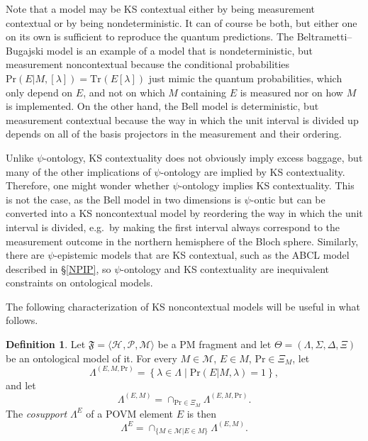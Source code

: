 \documentclass[DIV=calc,paper=a4,fontsize=11pt,twocolumn]{scrartcl} %
\theoremstyle{definition}
\newtheorem{definition}{Definition}[section]
\theoremstyle{plain}
\newcommand{\Proj}[1]{\ensuremath{\left [ #1 \right ]}}
\newcommand{\Hilb}[1][]{\ensuremath{\mathcal{H}_{#1}}}
\newcommand{\Tr}[2][]{\ensuremath{\text{Tr}_{#1} \left ( #2 \right )}}
\begin{document}
Note that a model may be KS contextual either by being measurement
contextual or by being nondeterministic.  It can of course be both,
but either one on its own is sufficient to reproduce the quantum
predictions.  The Beltrametti--Bugajski model is an example of a model
that is nondeterministic, but measurement noncontextual because the
conditional probabilities $\text{Pr}(E|M,\Proj{\lambda}) = \Tr{E
\Proj{\lambda}}$ just mimic the quantum probabilities, which only
depend on $E$, and not on which $M$ containing $E$ is measured nor on
how $M$ is implemented.  On the other hand, the Bell model is
deterministic, but measurement contextual because the way in which the
unit interval is divided up depends on all of the basis projectors in
the measurement and their ordering.

Unlike $\psi$-ontology, KS contextuality does not obviously imply
excess baggage, but many of the other implications of $\psi$-ontology
are implied by KS contextuality.  Therefore, one might wonder whether
$\psi$-ontology implies KS contextuality.  This is not the case, as
the Bell model in two dimensions is $\psi$-ontic but can be converted
into a KS noncontextual model by reordering the way in which the unit
interval is divided, e.g.\ by making the first interval always
correspond to the measurement outcome in the northern hemisphere of
the Bloch sphere.  Similarly, there are $\psi$-epistemic models that
are KS contextual, such as the ABCL model described in \S\ref{NPIP},
so $\psi$-ontology and KS contextuality are inequivalent constraints
on ontological models.

The following characterization of KS noncontextual models will be
useful in what follows.

\begin{definition}
\label{def:KS:cosupp}
Let $\mathfrak{F} = \langle \Hilb, \mathcal{P}, \mathcal{M} \rangle$
be a PM fragment and let $\Theta = (\Lambda, \Sigma, \Delta, \Xi)$
be an ontological model of it.  For every $M \in \mathcal{M}$, $E
\in M$, $\text{Pr} \in \Xi_M$, let
\begin{equation}
\Lambda^{(E,M,\text{Pr})} = \left \{ \lambda \in \Lambda \middle |
\text{Pr}(E|M,\lambda) = 1 \right \},
\end{equation}
and let
\begin{equation}
\Lambda^{(E,M)} = \cap_{\text{Pr} \in \Xi_M} \Lambda^{(E,M,\text{Pr})}.
\end{equation}
The \emph{cosupport} $\Lambda^E$ of a POVM element $E$ is then
\begin{equation}
\Lambda^E = \cap_{\{M \in \mathcal{M}|E \in M\}} \Lambda^{(E,M)}.
\end{equation}
\end{definition}
\end{document}
